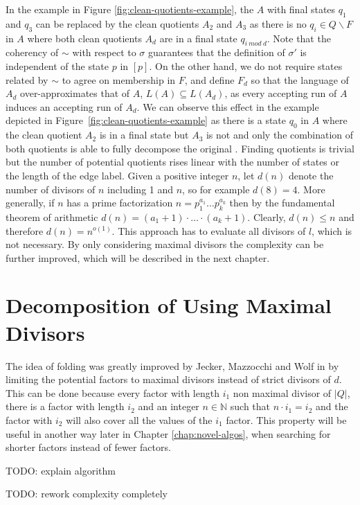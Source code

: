 In the example in Figure \ref{fig:clean-quotients-example}, the \DFA $A$ with final states $q_1$ and $q_3$ can be replaced by the clean quotients $A_2$ and $A_3$ as there is no $q_i \in Q \backslash F$ in $A$ where both clean quotients $A_d$ are in a final state $q_{i ~mod~ d}$. Note that the coherency of $\sim$ with respect to $\sigma$ guarantees that the definition of $\sigma'$ is independent of the state $p$ in $[p]$. On the other hand, we do not require states related by $\sim$ to agree on membership in $F$, and define $F_d$ so that the language of $A_d$ over-approximates that of $A$, $L(A) \subseteq L(A_d)$, as every accepting run of $A$ induces an accepting run of $A_d$. We can observe this effect in the example depicted in Figure~\ref{fig:clean-quotients-example} as there is a state $q_0$ in $A$ where the clean quotient $A_2$ is in a final state but $A_3$ is not and only the combination of both quotients is able to fully decompose the original \DFA. Finding quotients is trivial but the number of potential quotients rises linear with the number of states or the length of the edge label. Given a positive integer $n$, let $d(n)$ denote the number of divisors of $n$ including 1 and $n$, so for example $d(8)=4$. More generally, if $n$ has a prime factorization $n = p_1^{a_1} \ldots p_k^{a_k}$ then by the fundamental theorem of arithmetic $d(n) = (a_1+1) \cdot \ldots \cdot (a_k+1)$. Clearly, $d(n) \leq n$ and therefore $d(n) = n^{o(1)}$. This approach has to evaluate all divisors of $l$, which is not necessary. By only considering maximal divisors the complexity can be further improved, which will be described in the next chapter.

\section{Decomposition of \DFAs Using Maximal Divisors}
\label{ch:analysis:max-divisors}
The idea of folding \DFAs was greatly improved by Jecker, Mazzocchi and Wolf in \cite{DBLP:journals/corr/abs-2107-04683} by limiting the potential factors to maximal divisors instead of strict divisors of $d$. This can be done because every factor with length $i_1$ non maximal divisor of $|Q|$, there is a factor with length $i_2$ and an integer $n \in \mathbb{N}$ such that $n \cdot i_1 = i_2$ and the factor with $i_2$ will also cover all the values of the $i_1$ factor. This property will be useful in another way later in Chapter \ref{chap:novel-algos}, when searching for shorter factors instead of fewer factors.

TODO: explain algorithm

TODO: rework complexity completely 




